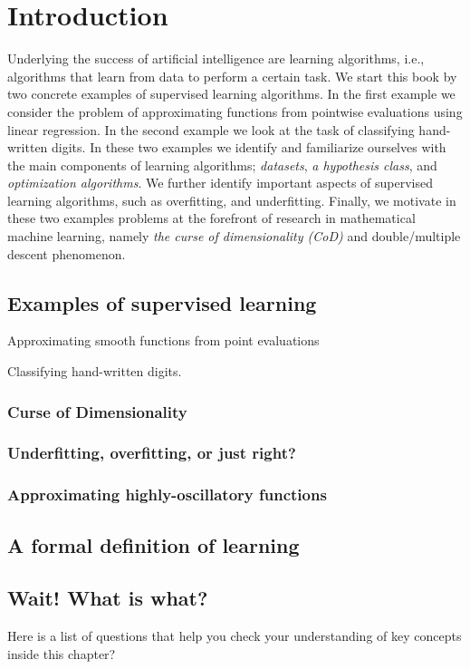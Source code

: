 \chapter{Introduction} %

\label{Chapter1} %
\setcounter{chapter}{1}

\newcommand{\keyword}[1]{\textbf{#1}}
\newcommand{\tabhead}[1]{\textbf{#1}}
\newcommand{\code}[1]{\texttt{#1}}
\newcommand{\file}[1]{\texttt{\bfseries#1}}
\newcommand{\option}[1]{\texttt{\itshape#1}}
Underlying the success of artificial intelligence are learning algorithms, i.e.,
algorithms that learn from data to perform a certain task. We start this book by
two concrete examples of supervised learning algorithms. In the first example we
consider the problem of approximating functions from pointwise evaluations using linear regression. In the second example we look at the task of
classifying hand-written digits. In these two examples we identify and
familiarize ourselves with the main components of learning algorithms;
\emph{datasets}, \emph{a hypothesis class}, and \emph{optimization algorithms}.
We further identify important aspects of supervised learning algorithms, such as
overfitting, and underfitting. Finally, we motivate in these two examples
problems at the forefront of research in mathematical machine learning, namely
\emph{the curse of dimensionality (CoD)} and double/multiple descent phenomenon. 
 
\section{Examples of supervised learning}
\cite{Saleh:JCP155:144109}
Approximating smooth functions from point evaluations

Classifying hand-written digits. 

\subsection{Curse of Dimensionality}
\subsection{Underfitting, overfitting, or just right?}
\subsection{Approximating highly-oscillatory functions}

\section{A formal definition of learning}

\section*{Wait! What is what?}
Here is a list of questions that help you check your understanding of key
concepts inside this chapter?

